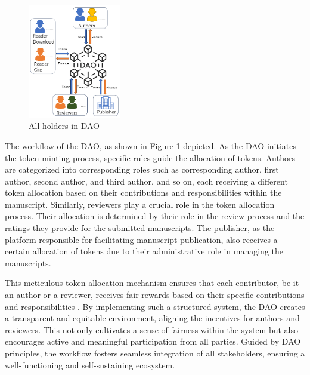 \documentclass[lettersize,journal]{IEEEtran}
\begin{document}
\begin{figure}[h]
  \centering
  \includegraphics[width=154px]{assets/daoframe.png}
  \caption{All holders in DAO}
  \label{fig:holdersindao}
\end{figure}


The workflow of the DAO, as shown in Figure \ref{fig:holdersindao} depicted. As the DAO initiates the token minting process, specific rules guide the allocation of tokens. Authors are categorized into corresponding roles such as corresponding author, first author, second author, and third author, and so on, each receiving a different token allocation based on their contributions and responsibilities within the manuscript. Similarly, reviewers play a crucial role in the token allocation process. Their allocation is determined by their role in the review process and the ratings they provide for the submitted manuscripts. The publisher, as the platform responsible for facilitating manuscript publication, also receives a certain allocation of tokens due to their administrative role in managing the manuscripts. 

This meticulous token allocation mechanism ensures that each contributor, be it an author or a reviewer, receives fair rewards based on their specific contributions and responsibilities \cite{10123021}. By implementing such a structured system, the DAO creates a transparent and equitable environment, aligning the incentives for authors and reviewers. This not only cultivates a sense of fairness within the system but also encourages active and meaningful participation from all parties. Guided by DAO principles, the workflow fosters seamless integration of all stakeholders, ensuring a well-functioning and self-sustaining ecosystem.
\end{document}
